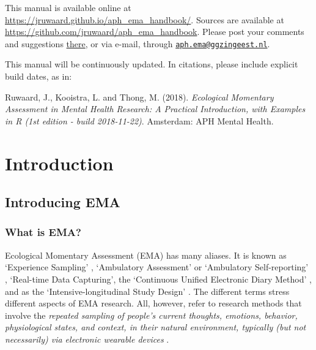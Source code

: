 \documentclass[]{book}
\begin{document}
This manual is available online at
\url{https://jruwaard.github.io/aph_ema_handbook/}. Sources are
available at \url{https://github.com/jruwaard/aph_ema_handbook}. Please
post your comments and suggestions
\href{https://github.com/jruwaard/aph_ema_handbook/issues}{there}, or
via e-mail, through
\href{mailto:aph.ema@ggzingeest.nl}{\nolinkurl{aph.ema@ggzingeest.nl}}.

This manual will be continuously updated. In citations, please include
explicit build dates, as in:

Ruwaard, J., Kooistra, L. and Thong, M. (2018). \emph{Ecological
Momentary Assessment in Mental Health Research: A Practical
Introduction, with Examples in R (1st edition - build 2018-11-22)}.
Amsterdam: APH Mental Health.

\mainmatter

\part{Introduction}\label{part-introduction}

\chapter{Introducing EMA}\label{introduction}

\section{What is EMA?}\label{what-is-ema}

  
 

Ecological Momentary Assessment (EMA) has many aliases. It is known as
`Experience Sampling' \citep{Larson1983}, `Ambulatory Assessment'
\citep{EbnerPriemer2009} or `Ambulatory Self-reporting'
\citep{Conner2012a}, `Real-time Data Capturing', the `Continuous Unified
Electronic Diary Method' \citep{EllisDavies2012}, and as the
`Intensive-longitudinal Study Design' \citep{Bolger2013}. The different
terms stress different aspects of EMA research. All, however, refer to
research methods that involve the \emph{repeated sampling of people's
current thoughts, emotions, behavior, physiological states, and context,
in their natural environment, typically (but not necessarily) via
electronic wearable devices} \citep{Shiffman2008}.
\end{document}
